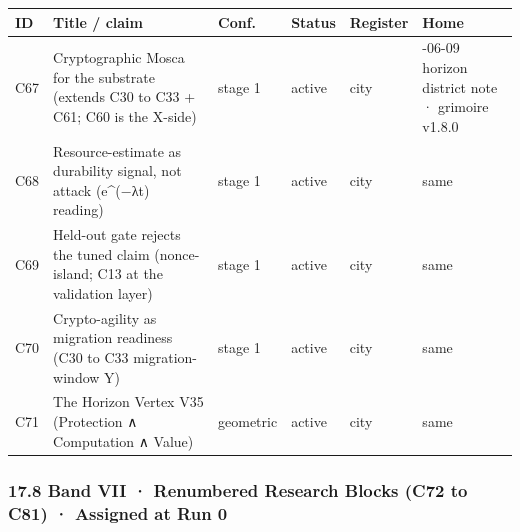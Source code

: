 \documentclass[
]{article}
\newcounter{none} %
\begin{document}
{\def\LTcaptype{none} %
\begin{longtable}[]{@{}
  >{\raggedright\arraybackslash}p{}
  >{\raggedright\arraybackslash}p{}
  >{\raggedright\arraybackslash}p{}
  >{\raggedright\arraybackslash}p{}
  >{\raggedright\arraybackslash}p{}
  >{\raggedright\arraybackslash}p{}@{}}
\toprule\noalign{}
\begin{minipage}[b]{\linewidth}\raggedright
ID
\end{minipage} & \begin{minipage}[b]{\linewidth}\raggedright
Title / claim
\end{minipage} & \begin{minipage}[b]{\linewidth}\raggedright
Conf.
\end{minipage} & \begin{minipage}[b]{\linewidth}\raggedright
Status
\end{minipage} & \begin{minipage}[b]{\linewidth}\raggedright
Register
\end{minipage} & \begin{minipage}[b]{\linewidth}\raggedright
Home
\end{minipage} \\
\midrule\noalign{}
\endhead
\bottomrule\noalign{}
\endlastfoot
C67 & Cryptographic Mosca for the substrate (extends C30 to C33 + C61;
C60 is the X-side) & stage 1 & active & city & 2026-06-09 horizon
district note · grimoire v1.8.0 \\
C68 & Resource-estimate as durability signal, not attack (e\^{}(−λt)
reading) & stage 1 & active & city & same \\
C69 & Held-out gate rejects the tuned claim (nonce-island; C13 at the
validation layer) & stage 1 & active & city & same \\
C70 & Crypto-agility as migration readiness (C30 to C33 migration-window
Y) & stage 1 & active & city & same \\
C71 & The Horizon Vertex V35 (Protection ∧ Computation ∧ Value) &
geometric & active & city & same \\
\end{longtable}
}

\subsubsection{17.8 Band VII · Renumbered Research Blocks (C72 to C81) ·
Assigned at Run
0}\label{band-vii-renumbered-research-blocks-c72-to-c81-assigned-at-run-0}
\end{document}
